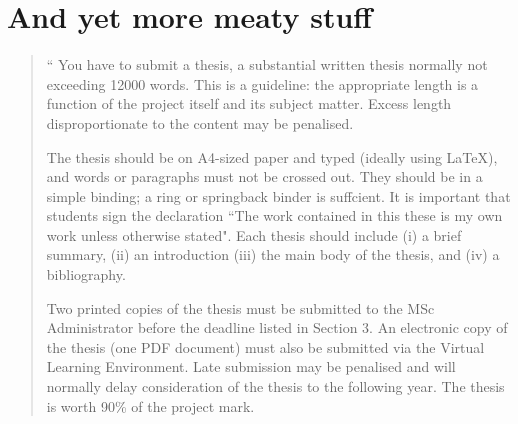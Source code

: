 \documentclass[11pt,a4,twosided,singlespacing,titlepagenumber=on]{scrreprt}
\numberwithin{equation}{chapter} %
\theoremstyle{remark}
\newenvironment{myquote}%
{\begin{quote}{\Large{}``}}%
{\ifhmode\unskip\fi{\Large{}''}\end{quote}}
\begin{document}
\chapter{And yet more meaty stuff}
\begin{myquote}
You have to submit a thesis, a substantial written thesis normally not exceeding 12000 words. This is a
guideline: the appropriate length is a function of the project itself and its subject matter. Excess length
disproportionate to the content may be penalised.

The thesis should be on A4-sized paper and typed (ideally using LaTeX), and words or paragraphs
must not be crossed out. They should be in a simple binding; a ring or springback binder is suffcient. It
is important that students sign the declaration ``The work contained in this these is my own work unless
otherwise stated". Each thesis should include (i) a brief summary, (ii) an introduction (iii) the main body
of the thesis, and (iv) a bibliography.

Two printed copies of the thesis must be submitted to the MSc Administrator before the deadline listed
in Section 3. An electronic copy of the thesis (one PDF document) must also be submitted via the Virtual
Learning Environment. Late submission may be penalised and will normally delay consideration of the
thesis to the following year.
The thesis is worth 90\% of the project mark.
\end{myquote}
\end{document}
